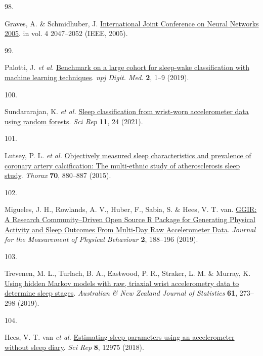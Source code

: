 \documentclass[
  10pt,
]{scrbook}
\newlength{\cslhangindent}
\newlength{\csllabelwidth}
\newlength{\cslentryspacingunit} %
\newenvironment{CSLReferences}[2] %
 {%
  \setlength{\parindent}{0pt}
  \ifodd #1
  \let\oldpar\par
  \def\par{\hangindent=\cslhangindent\oldpar}
  \fi
  \setlength{\parskip}{#2\cslentryspacingunit}
 }%
 {}
\newcommand{\CSLLeftMargin}[1]{\parbox[t]{\csllabelwidth}{#1}}
\newcommand{\CSLRightInline}[1]{\parbox[t]{\linewidth - \csllabelwidth}{#1}\break}
\let\originaltextbf\textbf
\renewcommand{\textbf}[1]{\textcolor{color1}{\textsf{\originaltextbf{#1}}}}
\begin{document}
\begin{CSLReferences}{0}{0}
\leavevmode{}%
\CSLLeftMargin{98. }%
\CSLRightInline{Graves, A. \& Schmidhuber, J.
\href{https://doi.org/10.1109/IJCNN.2005.1556215}{International Joint
Conference on Neural Networks 2005}. in vol. 4 2047--2052 (IEEE, 2005).}

\leavevmode{}%
\CSLLeftMargin{99. }%
\CSLRightInline{Palotti, J. \emph{et al.}
\href{https://doi.org/10.1038/s41746-019-0126-9}{Benchmark on a large
cohort for sleep-wake classification with machine learning techniques}.
\emph{npj Digit. Med.} \textbf{2}, 1--9 (2019).}

\leavevmode{}%
\CSLLeftMargin{100. }%
\CSLRightInline{Sundararajan, K. \emph{et al.}
\href{https://doi.org/10.1038/s41598-020-79217-x}{Sleep classification
from wrist-worn accelerometer data using random forests}. \emph{Sci Rep}
\textbf{11}, 24 (2021).}

\leavevmode{}%
\CSLLeftMargin{101. }%
\CSLRightInline{Lutsey, P. L. \emph{et al.}
\href{https://doi.org/10.1136/thoraxjnl-2015-206871}{Objectively
measured sleep characteristics and prevalence of coronary artery
calcification: The multi-ethnic study of atherosclerosis sleep study}.
\emph{Thorax} \textbf{70}, 880--887 (2015).}

\leavevmode{}%
\CSLLeftMargin{102. }%
\CSLRightInline{Migueles, J. H., Rowlands, A. V., Huber, F., Sabia, S.
\& Hees, V. T. van.
\href{https://doi.org/10.1123/jmpb.2018-0063}{{GGIR}: {A} {Research}
{Community}--{Driven} {Open} {Source} {R} {Package} for {Generating}
{Physical} {Activity} and {Sleep} {Outcomes} {From} {Multi}-{Day} {Raw}
{Accelerometer} {Data}}. \emph{Journal for the Measurement of Physical
Behaviour} \textbf{2}, 188--196 (2019).}

\leavevmode{}%
\CSLLeftMargin{103. }%
\CSLRightInline{Trevenen, M. L., Turlach, B. A., Eastwood, P. R.,
Straker, L. M. \& Murray, K.
\href{https://doi.org/10.1111/anzs.12270}{Using hidden Markov models
with raw, triaxial wrist accelerometry data to determine sleep stages}.
\emph{Australian \& New Zealand Journal of Statistics} \textbf{61},
273--298 (2019).}

\leavevmode{}%
\CSLLeftMargin{104. }%
\CSLRightInline{Hees, V. T. van \emph{et al.}
\href{https://doi.org/10.1038/s41598-018-31266-z}{Estimating sleep
parameters using an accelerometer without sleep diary}. \emph{Sci Rep}
\textbf{8}, 12975 (2018).}


\end{CSLReferences}
\end{document}
